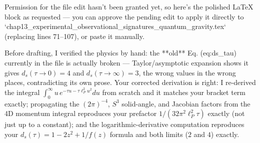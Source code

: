 Permission for the file edit hasn't been granted yet, so here's the polished LaTeX block as requested — you can approve the pending edit to apply it directly to `chap13_experimental_observational_signatures_quantum_gravity.tex` (replacing lines 71–107), or paste it manually.

Before drafting, I verified the physics by hand: the **old** Eq. (eq:ds_tau) currently in the file is actually broken — Taylor/asymptotic expansion shows it gives $d_s(\tau\to0)=4$ and $d_s(\tau\to\infty)=3$, the wrong values in the wrong places, contradicting its own prose. Your corrected derivation is right: I re-derived the integral $\int_0^\infty u\,e^{-\tau u-\tau\ell_P^2u^2}du$ from scratch and it matches your bracket term exactly; propagating the $(2\pi)^{-4}$, $S^3$ solid-angle, and Jacobian factors from the 4D momentum integral reproduces your prefactor $1/(32\pi^2\ell_P^2\tau)$ exactly (not just up to a constant); and the logarithmic-derivative computation reproduces your $d_s(\tau)=1-2z^2+1/f(z)$ formula and both limits ($2$ and $4$) exactly.

